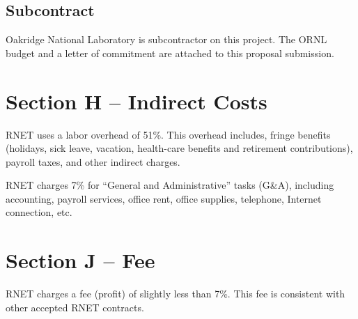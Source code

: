 \subsection{Subcontract}

Oakridge National Laboratory is subcontractor on this project. The ORNL budget
and a letter of commitment are attached to this proposal submission.

\section{Section H -- Indirect Costs}
RNET uses a labor overhead of 51\%. This overhead includes, fringe
benefits (holidays, sick leave, vacation, health-care benefits and
retirement contributions), payroll taxes, and other indirect charges.

RNET charges 7\% for ``General and Administrative'' tasks (G\&A),
including accounting, payroll services, office rent, office supplies,
telephone, Internet connection, etc.

\section{Section J -- Fee}
RNET charges a fee (profit) of slightly less than 7\%.  This fee is consistent with other accepted RNET contracts.

